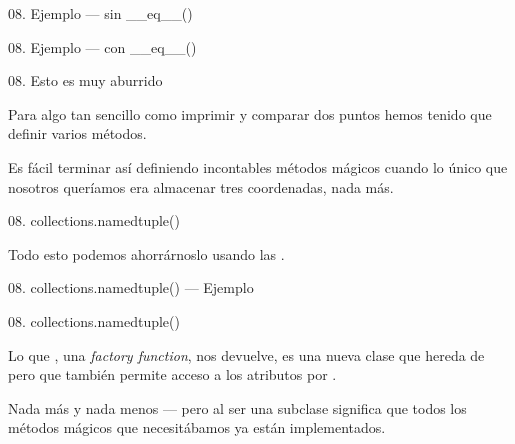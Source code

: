 \begin{frame}{08. Ejemplo — sin \_\_eq\_\_()}
  \scriptsize
\end{frame}

\begin{frame}{08. Ejemplo — con \_\_eq\_\_()}
  \footnotesize
\end{frame}

\begin{frame}{08. Esto es muy aburrido}
  \begin{block}{}
    \centering
    Para algo tan sencillo como imprimir y comparar dos puntos hemos
    tenido que definir varios métodos.
  \end{block}

  \begin{center}
    \small
    Es fácil terminar así definiendo incontables métodos mágicos
    cuando lo único que nosotros queríamos era almacenar tres
    coordenadas, nada más.
  \end{center}
\end{frame}

\begin{frame}{08. collections.namedtuple()}
  \begin{alertblock}{}
    \Large
    \centering
    Todo esto podemos ahorrárnoslo usando las
    .
  \end{alertblock}
\end{frame}

\begin{frame}{08. collections.namedtuple() — Ejemplo}
  \footnotesize
\end{frame}

\begin{frame}{08. collections.namedtuple()}
  \begin{block}{}
    \centering
    Lo que , una \textit{factory function},
    nos devuelve, es una nueva clase que hereda de 
      pero que también permite acceso a los atributos por
      .
  \end{block}

  \begin{center}
    \small
    Nada más y nada menos — pero al ser una subclase significa que
    todos los métodos mágicos que necesitábamos ya están
    implementados.
  \end{center}
\end{frame}

